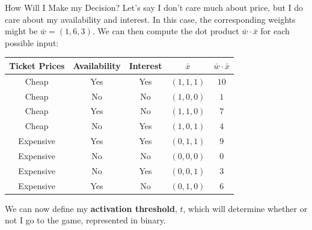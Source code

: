 \documentclass[xcolor=dvipsnames, fontsize=11pt, %
pagesize, %
parskip=half-, t]{beamer}
\begin{document}
\begin{frame}{How Will I Make my Decision?}
Let's say I don't care much about price, but I do care about my availability and interest. In this case, the corresponding weights might be $\bar{w}=(1, 6, 3)$. \pause We can then compute the dot product $\bar{w}\cdot \bar{x}$ for each possible input:  \pause 
\begin{table} 
\center 
\begin{tabular}{cccc|c}
Ticket Prices & Availability & Interest & $\bar{x}$ & $\bar{w}\cdot \bar{x}$ \\ \hline 
Cheap & Yes & Yes & $(1,1,1)$ & $10$ \\
Cheap & No & No & $(1,0,0)$ & $1$ \\
Cheap & Yes & No & $(1,1,0)$ & $7$\\
Cheap & No & Yes & $(1,0,1)$ & $4$   \\
Expensive & Yes & Yes & $(0,1,1)$ & $9$ \\
Expensive & No & No & $(0,0,0)$  & $0$ \\
Expensive & No & Yes & $(0,0,1)$ & $3$\\
Expensive & Yes & No & $(0,1,0)$ & $6$
\end{tabular}
\end{table} \pause
\vspace{0.05\textheight}
We can now define my \textbf{activation threshold}, $t$, which will determine whether or not I go to the game, represented in binary.
\end{frame}
\end{document}
